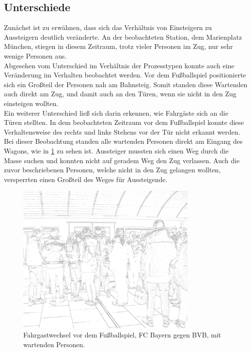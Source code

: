 \subsection{Unterschiede}
Zunächst ist zu erwähnen, dass sich das Verhältnis von Einsteigern zu Aussteigern deutlich veränderte. An der beobachteten Station, dem Marienplatz München, stiegen in diesem Zeitraum, trotz vieler Personen im Zug, nur sehr wenige Personen aus.\\ 
Abgesehen vom Unterschied im Verhältnis der Prozesstypen konnte auch eine Veränderung im Verhalten beobachtet werden. Vor dem Fußballspiel positionierte sich ein Großteil der Personen nah am Bahnsteig. Somit standen diese Wartenden auch direkt am Zug, und damit auch an den Türen, wenn sie nicht in den Zug einsteigen wollten.\\
Ein weiterer Unterschied ließ sich darin erkennen, wie Fahrgäste sich an die Türen stellten. In dem beobachteten Zeitraum vor dem Fußballspiel konnte diese Verhaltensweise des rechts und links Stehens vor der Tür nicht erkannt werden. Bei dieser Beobachtung standen alle wartenden Personen direkt am Eingang des Wagons, wie in \figurename \ref{fig:fussballFahrgastwechsel} zu sehen ist. Aussteiger mussten sich einen Weg durch die Masse suchen und konnten nicht auf geradem Weg den Zug verlassen. Auch die zuvor beschriebenen Personen, welche nicht in den Zug gelangen wollten, versperrten einen Großteil des Weges für Aussteigende. \\
\begin{figure}[H]
	\centering
		\includegraphics[width=0.8\textwidth]{pictures/observation/football/exchange_football.png}
	\caption{Fahrgastwechsel vor dem Fußballspiel, FC Bayern gegen BVB, mit wartenden Personen.}
	\label{fig:fussballFahrgastwechsel}
\end{figure}
